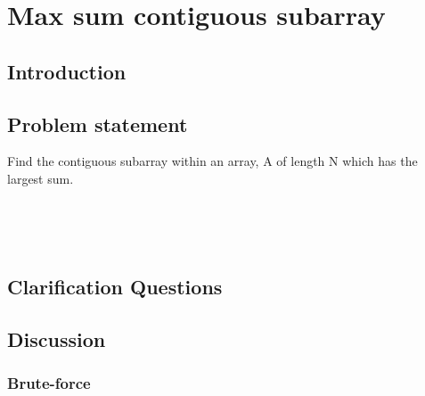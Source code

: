 %

\chapter{Max sum contiguous subarray}
\label{ch:max_sum_continguous_subarray}
\section*{Introduction}

\section{Problem statement}
\begin{exercise}
Find the contiguous subarray within an array, A of length N which has the largest sum.
\end{exercise}


\begin{example}
	\hfill \
	
\end{example}

\begin{example}
	\hfill \
	
\end{example}

\section{Clarification Questions}

\begin{QandA}
	\item 
	\begin{answered}
		\textit{}
	\end{answered}
	
\end{QandA}

\section{Discussion}
\label{max_sum_continguous_subarray:sec:discussion}


\subsection{Brute-force}
\label{max_sum_continguous_subarray:sec:bruteforce}



